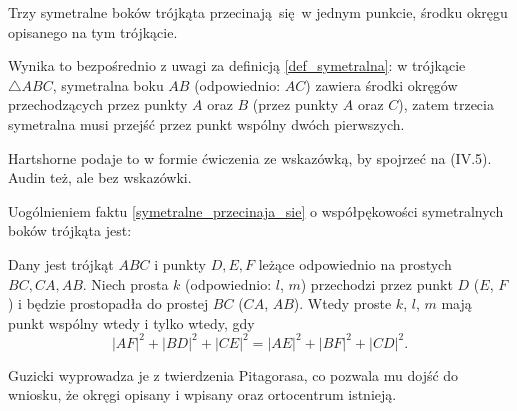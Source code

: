\begin{proposition}
    \label{symetralne_przecinaja_sie}
    Trzy symetralne boków trójkąta przecinają się w jednym punkcie, środku okręgu opisanego na tym trójkącie.
\end{proposition}

Wynika to bezpośrednio z uwagi za definicją \ref{def_symetralna}: w trójkącie $\triangle ABC$, symetralna boku $AB$ (odpowiednio: $AC$) zawiera środki okręgów przechodzących przez punkty $A$ oraz $B$ (przez punkty $A$ oraz $C$), zatem trzecia symetralna musi przejść przez punkt wspólny dwóch pierwszych.

Hartshorne \cite[s. 16]{hartshorne2000} podaje to w formie ćwiczenia ze wskazówką, by spojrzeć na (IV.5).
Audin \cite[s. 61]{audin_2003} też, ale bez wskazówki.

Uogólnieniem faktu \ref{symetralne_przecinaja_sie} o współpękowości symetralnych boków trójkąta jest:

\begin{theorem}[Carnota]
%
\label{guzicki_6_13}%
	Dany jest trójkąt $ABC$ i punkty $D, E, F$ leżące odpowiednio na prostych $BC, CA, AB$.
	Niech prosta $k$ (odpowiednio: $l$, $m$) przechodzi przez punkt $D$ ($E$, $F$) i będzie prostopadła do prostej $BC$ ($CA$, $AB$).
	Wtedy proste $k$, $l$, $m$ mają punkt wspólny wtedy i tylko wtedy, gdy
	\begin{equation}
		|AF|^2 + |BD|^2 + |CE|^2 = |AE|^2 + |BF|^2 + |CD|^2.
	\end{equation}
\end{theorem}

Guzicki \cite[s. 176]{guzicki_2021} wyprowadza je z twierdzenia Pitagorasa, co pozwala mu dojść do wniosku, że okręgi opisany i wpisany oraz ortocentrum istnieją.
